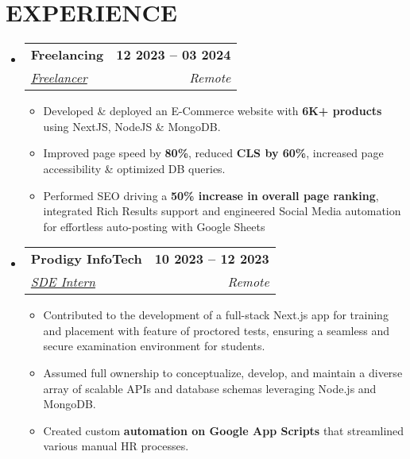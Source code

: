 \documentclass[letterpaper,11pt]{article}
\makeatletter
\newcommand{\resumeItem}[1]{
  \item\small{
    {#1 \vspace{-2pt}}
  }
}
\newcommand{\resumeSubheading}[4]{
  \vspace{-2pt}\item
    \begin{tabular*}{1.0\textwidth}[t]{l@{\extracolsep{\fill}}r}
      \textbf{\large#1} & \textbf{\small #2} \\
      \textit{\large#3} & \textit{\small #4} \\
      
    \end{tabular*}\vspace{-7pt}
}
\newcommand{\resumeSubHeadingListStart}{\begin{itemize}[leftmargin=0.0in, label={}]}
\newcommand{\resumeSubHeadingListEnd}{\end{itemize}}
\newcommand{\resumeItemListStart}{\begin{itemize}}
\newcommand{\resumeItemListEnd}{\end{itemize}\vspace{-5pt}}
\makeatother
\begin{document}
\section{EXPERIENCE}
  \resumeSubHeadingListStart

    \resumeSubheading
      {Freelancing \href{https://kumail.shop/}{\raisebox{-0.1\height}{{\faExternalLink*}} }}{12 2023 -- 03 2024} 
      {\underline{Freelancer}}{Remote}
      \resumeItemListStart
        \resumeItem{\normalsize{Developed \& deployed an E-Commerce website with \textbf{6K+ products} using NextJS, NodeJS \& MongoDB. }}
        \resumeItem{\normalsize{Improved page speed by \textbf{80\%}, reduced \textbf{CLS by 60\%}, increased page accessibility \& optimized DB queries.}}
        \resumeItem{\normalsize{Performed SEO driving a \textbf{50\% increase in overall page ranking}, integrated Rich Results support and engineered Social Media automation for effortless auto-posting with Google Sheets}}  
      \resumeItemListEnd  
    \resumeSubheading
      {Prodigy InfoTech}{10 2023 -- 12 2023} 
      {\underline{SDE Intern}}{Remote}
      \resumeItemListStart
          \resumeItem{\normalsize{Contributed to the development of a full-stack Next.js app for training and placement with  feature of proctored tests, ensuring a seamless and secure examination environment for students.}}
          \resumeItem{\normalsize{Assumed full ownership to conceptualize, develop, and maintain a diverse array of scalable APIs and database schemas leveraging Node.js and MongoDB.}}
          \resumeItem{\normalsize{Created custom \textbf{automation on Google App Scripts} that streamlined various manual HR processes.}}
      \resumeItemListEnd  

  \resumeSubHeadingListEnd
\vspace{-12pt}

\end{document}
